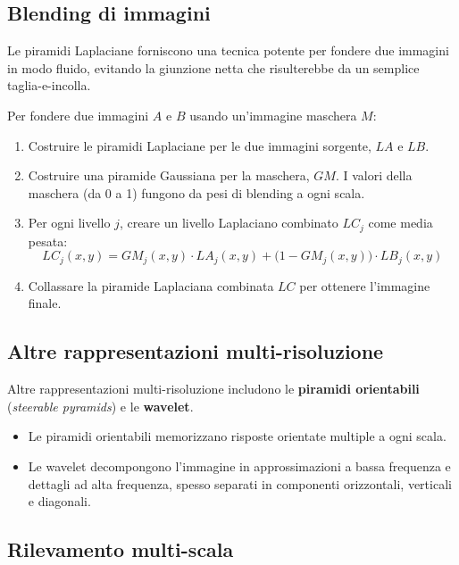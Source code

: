 \documentclass[12pt, a4paper]{report}
\begin{document}
\subsection{Blending di immagini}

Le piramidi Laplaciane forniscono una tecnica potente per fondere due immagini in
modo fluido, evitando la giunzione netta che risulterebbe da un semplice taglia-e-incolla.

\begin{notebox}
Per fondere due immagini $A$ e $B$ usando un'immagine maschera $M$:
\begin{enumerate}
  \item Costruire le piramidi Laplaciane per le due immagini sorgente, $LA$ e $LB$.
  \item Costruire una piramide Gaussiana per la maschera, $GM$.  I valori della
        maschera (da 0 a 1) fungono da pesi di blending a ogni scala.
  \item Per ogni livello $j$, creare un livello Laplaciano combinato $LC_j$ come
        media pesata:
        \[
          LC_j(x,y)
          = GM_j(x,y)\cdot LA_j(x,y)
          + \bigl(1-GM_j(x,y)\bigr)\cdot LB_j(x,y)
        \]
  \item Collassare la piramide Laplaciana combinata $LC$ per ottenere l'immagine
        finale.
\end{enumerate}
\end{notebox}

\subsection{Altre rappresentazioni multi-risoluzione}

Altre rappresentazioni multi-risoluzione includono le \textbf{piramidi orientabili}
(\emph{steerable pyramids}) e le \textbf{wavelet}.
\begin{itemize}
  \item Le piramidi orientabili memorizzano risposte orientate multiple a ogni scala.
  \item Le wavelet decompongono l'immagine in approssimazioni a bassa frequenza e
        dettagli ad alta frequenza, spesso separati in componenti orizzontali,
        verticali e diagonali.
\end{itemize}

\subsection{Rilevamento multi-scala}
\end{document}
